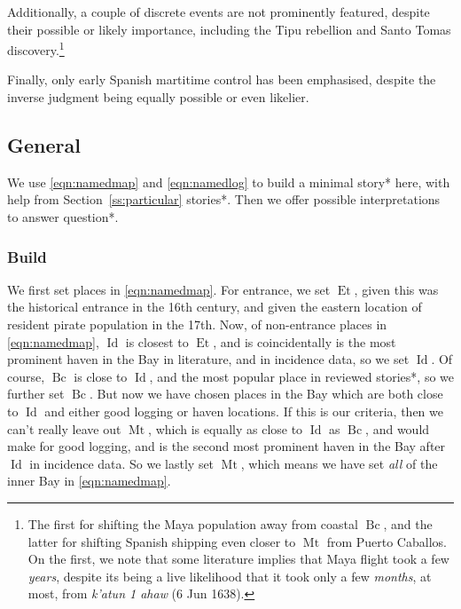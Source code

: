 \documentclass{amsart}
\newcommand{\forn}{\textit} %
\DeclareMathOperator{\id}{Id} %
\DeclareMathOperator{\mt}{Mt} %
\DeclareMathOperator{\bc}{Bc} %
\DeclareMathOperator{\et}{Et} %
\theoremstyle{definition}
\theoremstyle{remark}
\begin{document}
		Additionally, a couple of discrete events are not prominently featured, despite their possible or likely importance, including the Tipu rebellion and Santo Tomas discovery.\footnote{The first for shifting the Maya population away from coastal \(\bc\), and the latter for shifting Spanish shipping even closer to \(\mt\) from Puerto Caballos. On the first, we note that some literature implies that Maya flight took a few \emph{years}, despite its being a live likelihood that it took only a few \emph{months}, at most, from \forn{k'atun 1 ahaw} (6 Jun 1638).}
		
		Finally, only early Spanish martitime control has been emphasised, despite the inverse judgment being equally possible or even likelier.
	\subsection{General}
	\label{ss:general}
	We use \ref{eqn:namedmap} and \ref{eqn:namedlog} to build a minimal story* here, with help from Section~\ref{ss:particular} stories*. Then we offer possible interpretations to answer question*.
		\subsubsection{Build}
		\label{sss:storybuild}
		We first set places in \ref{eqn:namedmap}. For entrance, we set \(\et\), given this was the historical entrance in the 16th century, and given the eastern location of resident pirate population in the 17th. Now, of non-entrance places in \ref{eqn:namedmap}, \(\id\) is closest to \(\et\), and is coincidentally is the most prominent haven in the Bay in literature, and in incidence data, so we set \(\id\). Of course, \(\bc\) is close to \(\id\), and the most popular place in reviewed stories*, so we further set \(\bc\). But now we have chosen places in the Bay which are both close to \(\id\) and either good logging or haven locations. If this is our criteria, then we can't really leave out \(\mt\), which is equally as close to \(\id\) as \(\bc\), and would make for good logging, and is the second most prominent haven in the Bay after \(\id\) in incidence data. So we lastly set \(\mt\), which means we have set \emph{all} of the inner Bay in \ref{eqn:namedmap}.
		
\end{document}
